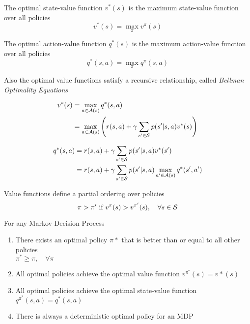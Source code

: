 
\begin{definition}
    The optimal state-value function $v^*(s)$ is the maximum state-value function over all policies
    \[v^*(s) = \max_\pi v^\pi(s)\]
\end{definition}
\begin{definition}
    The optimal action-value function $q^*(s)$ is the maximum action-value function over all policies
    \[q^*(s,a) = \max_\pi q^\pi(s,a)\]
\end{definition}

Also the optimal value functions satisfy a recursive relationship, called \textit{Bellman Optimality Equations}

\begin{equation}
    \label{eq:bellman_optimality_v}
    \begin{aligned}
        v^*(s) &= \max_{a \in \mathcal{A}(s)} q^*(s,a) \\
        &= \max_{a \in \mathcal{A}(s)} \left(r(s,a) + \gamma \sum_{s' \in \mathcal{S}}p(s'|s,a)v^*(s)\right)
    \end{aligned}
\end{equation}

\begin{equation}
    \label{eq:bellman_optimality_q}
    \begin{aligned}
        q^*(s, a) &= r(s,a) + \gamma \sum_{s' \in \mathcal{S}}p(s'|s,a)v^*(s')  \\
        &= r(s,a) + \gamma \sum_{s' \in \mathcal{S}}p(s'|s,a)\max_{a' \in \mathcal{A}(s)} q^*(s',a')
    \end{aligned}
\end{equation}

Value functions define a partial ordering over policies
\[\pi > \pi' \text{ if } v^\pi(s) > v^{\pi'}(s),\quad \forall s \in \mathcal{S}\]

\begin{theorem}
    For any Markov Decision Process
    \begin{enumerate}
        \item There exists an optimal policy $\pi*$ that is better than or equal to all other policies \\
        $\pi^* \ge \pi, \quad \forall \pi$
        \item All optimal policies achieve the optimal value function $v^{\pi^*}(s) = v*(s)$
        \item All optimal policies achieve the optimal state-value function $q^{\pi^*}(s, a) = q^*(s,a)$
        \item There is always a deterministic optimal policy for an MDP
    \end{enumerate}
\end{theorem}

